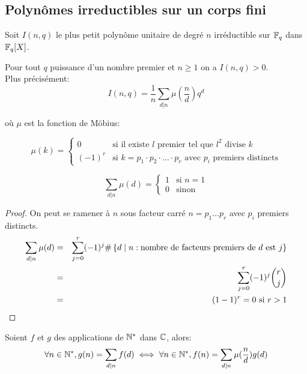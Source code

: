 \subsection{Polynômes irreductibles sur un corps fini}


Soit $I(n,q)$ le plus petit polynôme unitaire de degré $n$ irréductible sur $\mathbb{F}_q$ dans $\mathbb{F}_q[X]$.

\begin{theorem}
	Pour tout $q$ puissance d'un nombre premier et $n \geq 1$ on a $I(n,q) > 0$.\\

	Plus précisément:
	$$ I(n,q) = \frac{1}{n} \sum_{d|n} \mu(\frac{n}{d}) q^d$$

	où $\mu$ est la fonction de Möbius:

	\[ \mu(k) = \left\{\begin{array}{ll}
			0      & \text{si il existe } l \text{ premier tel que } l^2 \text{ divise } k                            \\
			(-1)^r & \text{si } k = p_1 \cdot p_2 \cdot \ldots \cdot p_r \text{ avec } p_i \text{ premiers distincts}
		\end{array} \right.\]

\end{theorem}

\begin{lemma}
	$$\sum_{d|n} \mu(d) = \left\{\begin{array}{ll}
			1 & \text{si } n = 1 \\
			0 & \text{sinon}
		\end{array} \right.$$
\end{lemma}

\begin{proof}
	On peut se ramener à $n$ sous facteur carré $n = p_1 \ldots p_r$ avec $p_i$ premiers distincts.\\
	\begin{eqnarray*}
		\sum_{d|n} \mu(d) &=& \sum_{j=0}^r (-1)^j \#\left\{d \mid n : \text{nombre de facteurs premiers de } d \text { est } j\right\} \\
		&=& \sum_{j=0}^r (-1)^j \binom{r}{j} \\
		&=& (1-1)^r = 0 \text{ si } r > 1
	\end{eqnarray*}
\end{proof}

\begin{lemma}
	Soient $f$ et $g$ des applications de $\mathbb{N}^*$ dans $\mathbb{C}$, alors:
	$$ \forall n \in \mathbb{N}^*, g(n) = \sum_{d|n} f(d) \iff \forall n \in \mathbb{N}^*, f(n) = \sum_{d|n} \mu(\frac n d) g(d) $$

\end{lemma}

